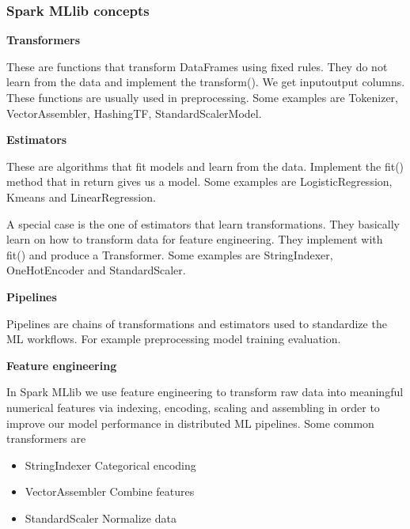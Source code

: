 \subsubsection{Spark MLlib concepts}

\textbf{Transformers}

These are functions that transform DataFrames using fixed rules. They do not learn from the data and implement the transform(). We get input\ra output columns. These functions are usually used in preprocessing. Some examples are Tokenizer, VectorAssembler, HashingTF, StandardScalerModel.

\vspace{10pt}

\textbf{Estimators}

These are algorithms that fit models and learn from the data. Implement the fit() method that in return gives us a model. Some examples are LogisticRegression, Kmeans and LinearRegression.

\vspace{10pt}

A special case is the one of estimators that learn transformations. They basically learn on how to transform data for feature engineering. They implement with fit() and produce a Transformer. Some examples are StringIndexer, OneHotEncoder and StandardScaler. 

\vspace{10pt}

\textbf{Pipelines}

Pipelines are chains of transformations and estimators used to standardize the ML workflows. For example preprocessing \ra model training \ra evaluation. 

\vspace{10pt}

\textbf{Feature engineering}

In Spark MLlib we use feature engineering to transform raw data into meaningful numerical features via indexing, encoding, scaling and assembling in order to improve our model performance in distributed ML pipelines. Some common transformers are 

\begin{itemize}
    \item StringIndexer \ra Categorical encoding
    \item VectorAssembler \ra Combine features
    \item StandardScaler \ra Normalize data
\end{itemize}


